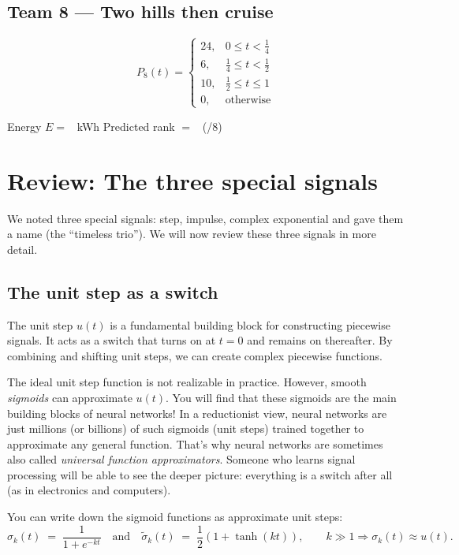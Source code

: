 \subsection*{Team 8 — Two hills then cruise}
\[
P_8(t)=
\begin{cases}
24, & 0 \le t < \tfrac{1}{4} \\
6,  & \tfrac{1}{4} \le t < \tfrac{1}{2} \\
10, & \tfrac{1}{2} \le t \le 1 \\
0,  & \text{otherwise}
\end{cases}
\]
\begin{tcolorbox}[title=Team 8: Record your results]
Energy \(E=\) \Eblank\ \si{kWh} \quad\quad Predicted rank \(=\) \Rankblank\ (/8)
\end{tcolorbox}
\newpage


\section{Review: The three special signals}
We noted three special signals: step, impulse, complex exponential and gave them a name (the ``timeless trio''). We will now review these three signals in more detail.
\
\subsection{The unit step as a switch}
The unit step $u(t)$ is a fundamental building block for constructing piecewise signals. It acts as a switch that turns on at \(t=0\) and remains on thereafter. By combining and shifting unit steps, we can create complex piecewise functions.

The ideal unit step function is not realizable in practice. However, smooth \emph{sigmoids} can approximate $u(t)$. You will find that these sigmoids are the main building blocks of neural networks! In a reductionist view, neural networks are just millions (or billions) of such sigmoids (unit steps) trained together to approximate any general function. That's why neural networks are sometimes also called \emph{universal function approximators}. Someone who learns signal processing will be able to see the deeper picture: everything is a switch after all (as in electronics and computers).

You can write down the sigmoid functions as approximate unit steps:
\[
\sigma_k(t) \;=\; \frac{1}{1+e^{-k t}}
\quad\text{and}\quad
\tilde\sigma_k(t) \;=\; \frac{1}{2}\!\left(1+\tanh(kt)\right),
\qquad k\gg 1 \Rightarrow \sigma_k(t)\approx u(t).
\]

